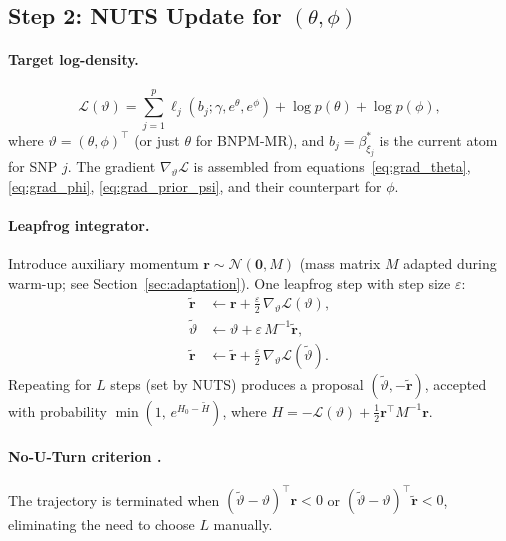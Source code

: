 \documentclass[12pt, a4paper]{article}
\theoremstyle{remark}
\newcommand{\Nor}{\mathcal{N}}
\begin{document}
\subsection{Step 2: NUTS Update for \texorpdfstring{$(\theta,\phi)$}{(theta,phi)}}
\label{sec:nuts}

\paragraph{Target log-density.}
\begin{equation}
  \mathcal{L}(\vartheta)
  = \sum_{j=1}^p \ell_j(b_j;\gamma,e^\theta,e^\phi)
    + \log p(\theta) + \log p(\phi),
\label{eq:nuts_target}
\end{equation}
where $\vartheta = (\theta,\phi)^\top$ (or just $\theta$ for BNPM-MR),
and $b_j = \beta_{\xi_j}^*$ is the current atom for SNP $j$.
The gradient $\nabla_\vartheta\mathcal{L}$ is assembled from
equations~\eqref{eq:grad_theta}, \eqref{eq:grad_phi},
\eqref{eq:grad_prior_psi}, and their counterpart for $\phi$.

\paragraph{Leapfrog integrator.}
Introduce auxiliary momentum $\mathbf{r} \sim \Nor(\mathbf{0}, M)$
(mass matrix $M$ adapted during warm-up; see
Section~\ref{sec:adaptation}).  One leapfrog step with step
size $\varepsilon$:
\begin{align}
  \tilde{\mathbf{r}} &\leftarrow
    \mathbf{r} + \tfrac{\varepsilon}{2}\,\nabla_\vartheta\mathcal{L}(\vartheta),
    \label{eq:lf1}\\
  \tilde\vartheta &\leftarrow
    \vartheta + \varepsilon\,M^{-1}\tilde{\mathbf{r}},
    \label{eq:lf2}\\
  \tilde{\mathbf{r}} &\leftarrow
    \tilde{\mathbf{r}} + \tfrac{\varepsilon}{2}\,
    \nabla_\vartheta\mathcal{L}(\tilde\vartheta).
    \label{eq:lf3}
\end{align}
Repeating for $L$ steps (set by NUTS) produces a proposal
$(\tilde\vartheta, -\tilde{\mathbf{r}})$, accepted with probability
$\min(1,\, e^{H_0 - \tilde H})$, where
$H = -\mathcal{L}(\vartheta) + \tfrac{1}{2}\mathbf{r}^\top M^{-1}\mathbf{r}$.

\paragraph{No-U-Turn criterion \cite{Hoffman2014}.}
The trajectory is terminated when
$(\tilde\vartheta - \vartheta)^\top\mathbf{r} < 0$ or
$(\tilde\vartheta - \vartheta)^\top\tilde{\mathbf{r}} < 0$,
eliminating the need to choose $L$ manually.
\end{document}
